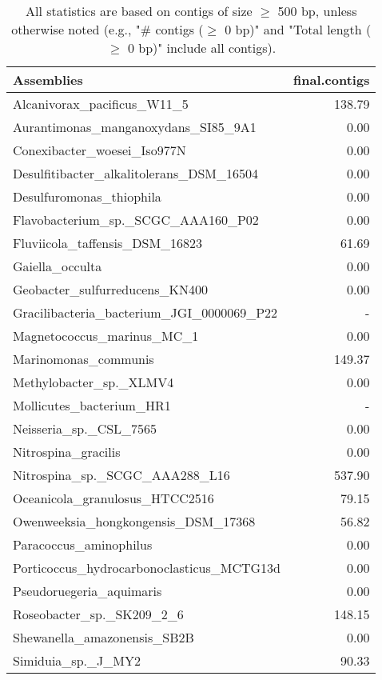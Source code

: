 \documentclass[12pt,a4paper]{article}
\begin{document}
\begin{table}[ht]
\begin{center}
\caption{All statistics are based on contigs of size $\geq$ 500 bp, unless otherwise noted (e.g., "\# contigs ($\geq$ 0 bp)" and "Total length ($\geq$ 0 bp)" include all contigs).}
\begin{tabular}{|l*{1}{|r}|}
\hline
Assemblies & final.contigs \\ \hline
Alcanivorax\_pacificus\_W11\_5 & 138.79 \\ \hline
Aurantimonas\_manganoxydans\_SI85\_9A1 & 0.00 \\ \hline
Conexibacter\_woesei\_Iso977N & 0.00 \\ \hline
Desulfitibacter\_alkalitolerans\_DSM\_16504 & 0.00 \\ \hline
Desulfuromonas\_thiophila & 0.00 \\ \hline
Flavobacterium\_sp.\_SCGC\_AAA160\_P02 & 0.00 \\ \hline
Fluviicola\_taffensis\_DSM\_16823 & 61.69 \\ \hline
Gaiella\_occulta & 0.00 \\ \hline
Geobacter\_sulfurreducens\_KN400 & 0.00 \\ \hline
Gracilibacteria\_bacterium\_JGI\_0000069\_P22 & - \\ \hline
Magnetococcus\_marinus\_MC\_1 & 0.00 \\ \hline
Marinomonas\_communis & 149.37 \\ \hline
Methylobacter\_sp.\_XLMV4 & 0.00 \\ \hline
Mollicutes\_bacterium\_HR1 & - \\ \hline
Neisseria\_sp.\_CSL\_7565 & 0.00 \\ \hline
Nitrospina\_gracilis & 0.00 \\ \hline
Nitrospina\_sp.\_SCGC\_AAA288\_L16 & 537.90 \\ \hline
Oceanicola\_granulosus\_HTCC2516 & 79.15 \\ \hline
Owenweeksia\_hongkongensis\_DSM\_17368 & 56.82 \\ \hline
Paracoccus\_aminophilus & 0.00 \\ \hline
Porticoccus\_hydrocarbonoclasticus\_MCTG13d & 0.00 \\ \hline
Pseudoruegeria\_aquimaris & 0.00 \\ \hline
Roseobacter\_sp.\_SK209\_2\_6 & 148.15 \\ \hline
Shewanella\_amazonensis\_SB2B & 0.00 \\ \hline
Simiduia\_sp.\_J\_MY2 & 90.33 \\ \hline

\end{tabular}
\end{center}
\end{table}
\end{document}
